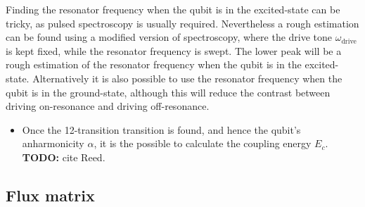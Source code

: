         Finding the resonator frequency when the qubit is in the excited-state can be tricky, as pulsed spectroscopy is usually required. Nevertheless a rough estimation can be found using a modified version of spectroscopy, where the drive tone $\omega_\text{drive}$ is kept fixed, while the resonator frequency is swept. The lower peak will be a rough estimation of the resonator frequency when the qubit is in the excited-state. Alternatively it is also possible to use the resonator frequency when the qubit is in the ground-state, although this will reduce the contrast between driving on-resonance and driving off-resonance.

        \begin{itemize}
           \item Once the 12-transition transition is found, and hence the qubit's anharmonicity $\alpha$, it is the possible to calculate the coupling energy $E_c$. \textbf{TODO:} cite Reed.
        \end{itemize}

      \subsection{Flux matrix}
        \label{ssec:Flux matrix}

